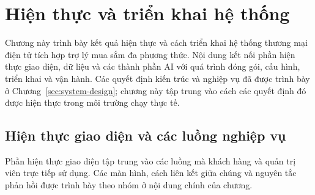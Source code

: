 
\section{Hiện thực và triển khai hệ thống}

Chương này trình bày kết quả hiện thực và cách triển khai hệ thống thương mại điện tử tích hợp trợ lý mua sắm đa phương thức. Nội dung kết nối phần hiện thực giao diện, dữ liệu và các thành phần AI với quá trình đóng gói, cấu hình, triển khai và vận hành. Các quyết định kiến trúc và nghiệp vụ đã được trình bày ở Chương~\ref{sec:system-design}; chương này tập trung vào cách các quyết định đó được hiện thực trong môi trường chạy thực tế.




\subsection{Hiện thực giao diện và các luồng nghiệp vụ}

Phần hiện thực giao diện tập trung vào các luồng mà khách hàng và quản trị viên trực tiếp sử dụng. Các màn hình, cách liên kết giữa chúng và nguyên tắc phản hồi được trình bày theo nhóm ở nội dung chính của chương.



